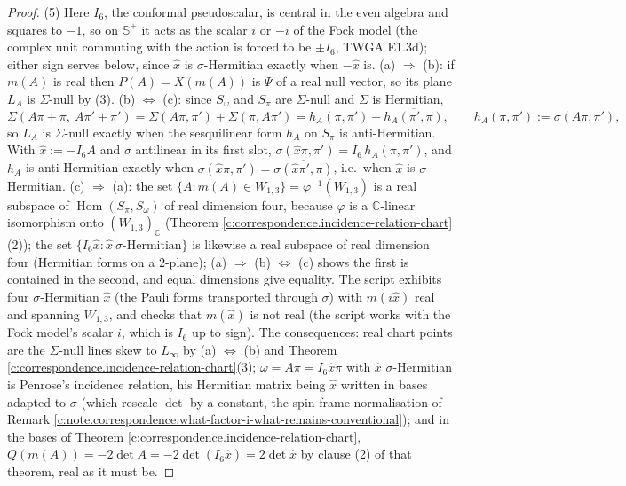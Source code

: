 \documentclass[11pt]{article}
\theoremstyle{definition}
\theoremstyle{plain}
\providecommand{\C}{}\renewcommand{\C}{\mathbb{C}}
\providecommand{\CS}{}\renewcommand{\CS}{{\mathbb{S}^{+}}}
\providecommand{\Som}{}\renewcommand{\Som}{S_\omega}
\providecommand{\Spi}{}\renewcommand{\Spi}{S_\pi}
\begin{document}
\begin{proof}
(5) Here $I_6$, the conformal pseudoscalar, is central in the even algebra and squares to $-1$, so on $\CS$ it acts as the scalar $i$ or $-i$ of the Fock model (the complex unit commuting with the action is forced to be $\pm I_6$, TWGA E1.3d); either sign serves below, since $\hat x$ is $\sigma$-Hermitian exactly when $-\hat x$ is. (a) $\Rightarrow$ (b): if $m(A)$ is real then $P(A) = X(m(A))$ is $\Psi$ of a real null vector, so its plane $L_A$ is $\Sigma$-null by (3). (b) $\Leftrightarrow$ (c): since $\Som$ and $\Spi$ are $\Sigma$-null and $\Sigma$ is Hermitian,
\[
\Sigma(A\pi + \pi,\ A\pi' + \pi') = \Sigma(A\pi, \pi') + \Sigma(\pi, A\pi') = h_A(\pi,\pi') + \overline{h_A(\pi',\pi)}, \qquad h_A(\pi,\pi') := \sigma(A\pi, \pi'),
\]
so $L_A$ is $\Sigma$-null exactly when the sesquilinear form $h_A$ on $\Spi$ is anti-Hermitian. With $\hat x := -I_6A$ and $\sigma$ antilinear in its first slot, $\sigma(\hat x\pi, \pi') = I_6\,h_A(\pi,\pi')$, and $h_A$ is anti-Hermitian exactly when $\sigma(\hat x\pi,\pi') = \overline{\sigma(\hat x\pi',\pi)}$, i.e.\ when $\hat x$ is $\sigma$-Hermitian. (c) $\Rightarrow$ (a): the set $\{A : m(A) \in W_{1,3}\} = \varphi^{-1}(W_{1,3})$ is a real subspace of $\operatorname{Hom}(\Spi,\Som)$ of real dimension four, because $\varphi$ is a $\C$-linear isomorphism onto $(W_{1,3})_\C$ (Theorem \ref{c:correspondence.incidence-relation-chart}(2)); the set $\{I_6\hat x : \hat x\ \sigma\text{-Hermitian}\}$ is likewise a real subspace of real dimension four (Hermitian forms on a $2$-plane); (a) $\Rightarrow$ (b) $\Leftrightarrow$ (c) shows the first is contained in the second, and equal dimensions give equality. The script exhibits four $\sigma$-Hermitian $\hat x$ (the Pauli forms transported through $\sigma$) with $m(i\hat x)$ real and spanning $W_{1,3}$, and checks that $m(\hat x)$ is not real (the script works with the Fock model's scalar $i$, which is $I_6$ up to sign). The consequences: real chart points are the $\Sigma$-null lines skew to $L_\infty$ by (a) $\Leftrightarrow$ (b) and Theorem \ref{c:correspondence.incidence-relation-chart}(3); $\omega = A\pi = I_6\hat x\pi$ with $\hat x$ $\sigma$-Hermitian is Penrose's incidence relation, his Hermitian matrix being $\hat x$ written in bases adapted to $\sigma$ (which rescale $\det$ by a constant, the spin-frame normalisation of Remark \ref{c:note.correspondence.what-factor-i-what-remains-conventional}); and in the bases of Theorem \ref{c:correspondence.incidence-relation-chart}, $Q(m(A)) = -2\det A = -2\det(I_6\hat x) = 2\det\hat x$ by clause (2) of that theorem, real as it must be.

\end{proof}
\end{document}
